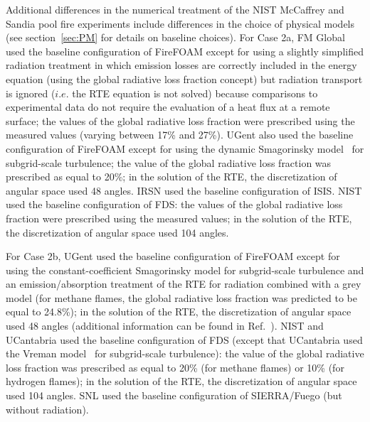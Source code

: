 Additional differences in the numerical treatment of the NIST McCaffrey and Sandia pool fire experiments include differences in the choice of physical models (see section~\ref{sec:PM} for details on baseline choices). For Case 2a, FM Global used the baseline configuration of FireFOAM except for using a slightly simplified radiation treatment in which emission losses are correctly included in the energy equation (using the global radiative loss fraction concept) but radiation transport is ignored ($i.e.$ the RTE equation is not solved) because comparisons to experimental data do not require the evaluation of a heat flux at a remote surface; the values of the global radiative loss fraction were prescribed using the measured values (varying between 17\% and 27\%). UGent also used the baseline configuration of FireFOAM except for using the dynamic Smagorinsky model~\cite{Moin:1991} for subgrid-scale turbulence; the value of the global radiative loss fraction was prescribed as equal to 20\%; in the solution of the RTE, the discretization of angular space used 48 angles. IRSN used the baseline configuration of ISIS. NIST used the baseline configuration of FDS: the values of the global radiative loss fraction were prescribed using the measured values; in the solution of the RTE, the discretization of angular space used 104 angles.

For Case 2b, UGent used the baseline configuration of FireFOAM except for using the constant-coefficient Smagorinsky model for subgrid-scale turbulence and an emission/absorption treatment of the RTE for radiation combined with a grey model (for methane flames, the global radiative loss fraction was predicted to be equal to 24.8\%); in the solution of the RTE, the discretization of angular space used 48 angles (additional information can be found in Ref.~\cite{Maragkos:2017}). NIST and UCantabria used the baseline configuration of FDS (except that UCantabria used the Vreman model~\cite{FDS_Math_Guide} for subgrid-scale turbulence): the value of the global radiative loss fraction was prescribed as equal to 20\% (for methane flames) or 10\% (for hydrogen flames); in the solution of the RTE, the discretization of angular space used 104 angles. SNL used the baseline configuration of SIERRA/Fuego (but without radiation).

